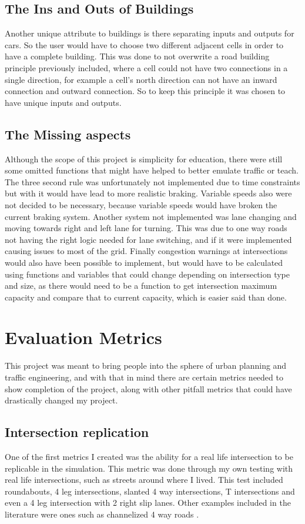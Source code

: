 \documentclass[10pt,twocolumn]{article}
\begin{document}
\subsection{The Ins and Outs of Buildings}
Another unique attribute to buildings is there separating inputs and outputs for cars. So the user would have to choose two different adjacent cells in order to have a complete building. This was done to not overwrite a road building principle previously included, where a cell could not have two connections in a single direction, for example a cell's north direction can not have an inward connection and outward connection. So to keep this principle it was chosen to have unique inputs and outputs.
\subsection{The Missing aspects} 
Although the scope of this project is simplicity for education, there were still some omitted functions that might have helped to better emulate traffic or teach. The three second rule \cite{CADMVDrivingManual} was unfortunately not implemented due to time constraints but with it would have lead to more realistic braking. Variable speeds also were not decided to be necessary, because variable speeds would have broken the current braking system. Another system not implemented was lane changing and moving towards right and left lane for turning. This was due to one way roads not having the right logic needed for lane switching, and if it were implemented causing issues to most of the grid. Finally congestion warnings at intersections would also have been possible to implement, but would have to be calculated using functions and variables that could change depending on intersection type and size, as there would need to be a function to get intersection maximum capacity and compare that to current capacity, which is easier said than done.

\section{Evaluation Metrics}
This project was meant to bring people into the sphere of urban planning and traffic engineering, and with that in mind there are certain metrics needed to show completion of the project, along with other pitfall metrics that could have drastically changed my project. 
\subsection{Intersection replication}
\label{replication}
One of the first metrics I created was the ability for a real life intersection to be replicable in the simulation. This metric was done through my own testing with real life intersections, such as streets around where I lived. This test included roundabouts, 4 leg intersections, slanted 4 way intersections, T intersections and even a 4 leg intersection with 2 right slip lanes. Other examples included in the literature were ones such as channelized 4 way roads \cite{GeometricDesign}.
\end{document}
